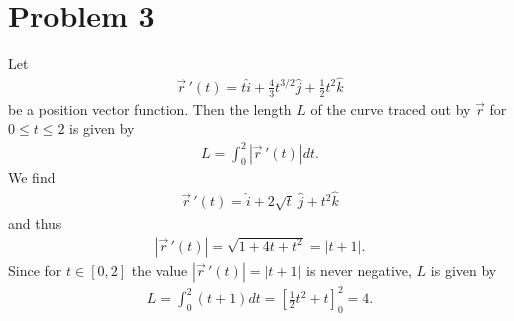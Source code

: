 \documentclass{article}
\newcommand{\ih}{\widehat i}
\newcommand{\jh}{\widehat j}
\newcommand{\kh}{\widehat k}
\newcommand{\dv}[1]{\vec #1\, '}
\begin{document}
\section*{Problem 3}
Let
\begin{align*}
  \dv r(t) = t\ih + \frac{4}{3}t^{3/2}\jh + \frac{1}{2}t^2\kh
\end{align*}
be a position vector function. 
Then the length $L$ of the curve traced out by $\vec r$ for $0\leq t \leq 2$ is given by
\begin{align*}
  L = \int_0^2 \left|\dv r(t)\right|dt.
\end{align*}
We find
\begin{align*}
  \dv r(t) = \ih + 2\sqrt{t}\:\jh + t^2\kh
\end{align*}
and thus
\begin{align*}
  |\dv r(t)| = \sqrt{1 + 4t + t^2}=|t+1|.
\end{align*}
Since for $t\in[0,2]$ the value $|\dv r(t)|=|t+1|$ is never
negative, $L$ is given by
\begin{align*}
  L = \int_0^2 (t+1)dt = \left[\frac{1}{2}t^2+t\right]_0^2=4.
\end{align*}
\end{document}
